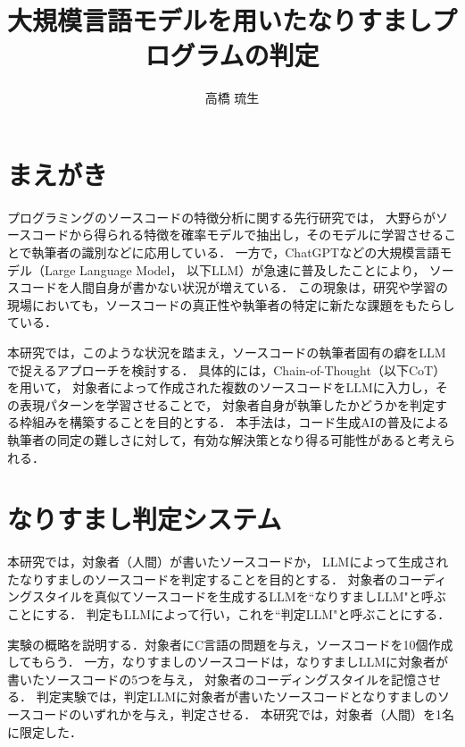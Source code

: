 \documentclass[twocolumn]{jarticle}
\begin{document}
\pagestyle{empty}

\date{}
\title{大規模言語モデルを用いたなりすましプログラムの判定}
\author{高橋 琉生}
\maketitle

\suppressfloats[t]


\section{まえがき}

プログラミングのソースコードの特徴分析に関する先行研究では，
大野ら\cite{lit:大野}がソースコードから得られる特徴を確率モデルで抽出し，そのモデルに学習させることで執筆者の識別などに応用している．
一方で，ChatGPTなどの大規模言語モデル（Large Language Model， 以下LLM）が急速に普及したことにより，
ソースコードを人間自身が書かない状況が増えている．
この現象は，研究や学習の現場においても，ソースコードの真正性や執筆者の特定に新たな課題をもたらしている．

本研究では，このような状況を踏まえ，ソースコードの執筆者固有の癖をLLMで捉えるアプローチを検討する．
具体的には，Chain-of-Thought（以下CoT）\cite{lit:Jason}を用いて，
対象者によって作成された複数のソースコードをLLMに入力し，その表現パターンを学習させることで，
対象者自身が執筆したかどうかを判定する枠組みを構築することを目的とする．
本手法は，コード生成AIの普及による執筆者の同定の難しさに対して，有効な解決策となり得る可能性があると考えられる．

\section{なりすまし判定システム}
本研究では，対象者（人間）が書いたソースコードか，
LLMによって生成されたなりすましのソースコードを判定することを目的とする．
対象者のコーディングスタイルを真似てソースコードを生成するLLMを``なりすましLLM"と呼ぶことにする．
判定もLLMによって行い，これを``判定LLM"と呼ぶことにする．

実験の概略を説明する．対象者にC言語の問題を与え，ソースコードを10個作成してもらう．
一方，なりすましのソースコードは，なりすましLLMに対象者が書いたソースコードの5つを与え，
対象者のコーディングスタイルを記憶させる．
判定実験では，判定LLMに対象者が書いたソースコードとなりすましのソースコードのいずれかを与え，判定させる．
本研究では，対象者（人間）を1名に限定した．
\end{document}
